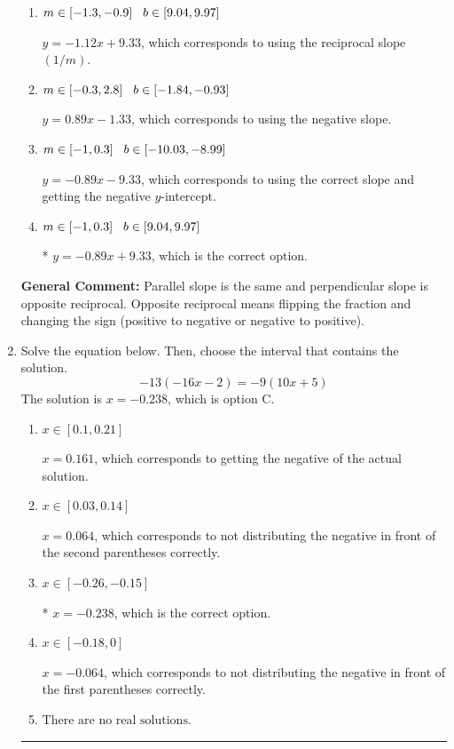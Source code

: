\documentclass{extbook}[14pt]
\newcommand{\litem}[1]{\item #1

\rule{\textwidth}{0.4pt}}
\begin{document}
\begin{enumerate}
{\begin{enumerate}[label=\Alph*.]
 $y = -0.89x - 2.00$, which corresponds to correct slope and mis-distributing while simplifying to slope-intercept form.
\item \( m \in [-1.3, -0.9] \hspace*{3mm} b \in [9.04, 9.97] \)

 $y = -1.12x + 9.33$, which corresponds to using the reciprocal slope $(1/m)$.
\item \( m \in [-0.3, 2.8] \hspace*{3mm} b \in [-1.84, -0.93] \)

 $y = 0.89x - 1.33$, which corresponds to using the negative slope.
\item \( m \in [-1, 0.3] \hspace*{3mm} b \in [-10.03, -8.99] \)

 $y = -0.89x - 9.33$, which corresponds to using the correct slope and getting the negative $y$-intercept.
\item \( m \in [-1, 0.3] \hspace*{3mm} b \in [9.04, 9.97] \)

* $y = -0.89x + 9.33$, which is the correct option.
\end{enumerate}

\textbf{General Comment:} Parallel slope is the same and perpendicular slope is opposite reciprocal. Opposite reciprocal means flipping the fraction and changing the sign (positive to negative or negative to positive).
}
\litem{
Solve the equation below. Then, choose the interval that contains the solution.
\[ -13(-16x -2) = -9(10x + 5) \]The solution is \( x = -0.238 \), which is option C.\begin{enumerate}[label=\Alph*.]
\item \( x \in [0.1, 0.21] \)

$x = 0.161$, which corresponds to getting the negative of the actual solution.
\item \( x \in [0.03, 0.14] \)

$x = 0.064$, which corresponds to not distributing the negative in front of the second parentheses correctly.
\item \( x \in [-0.26, -0.15] \)

* $x = -0.238$, which is the correct option.
\item \( x \in [-0.18, 0] \)

$x = -0.064$, which corresponds to not distributing the negative in front of the first parentheses correctly.
\item \( \text{There are no real solutions.} \)


\end{enumerate}}
\end{enumerate}
\end{document}

